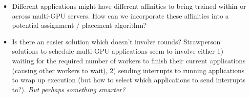 \documentclass{article}
\begin{document}
\begin{itemize}
\item Different applications might have different affinities to being trained
within or across multi-GPU servers. How can we incorporate these affinities into
a potential assignment / placement algorithm?

\item Is there an easier solution which doesn't involve rounds? Strawperson
solutions to schedule multi-GPU applications seem to involve either 1)
waiting for the required number of workers to finish their current applications
(causing other workers to wait), 2) sending interrupts to running applications
to wrap up execution (but how to select which applications to send interrupts to?).
\textit{But perhaps something smarter?}

\end{itemize}
\end{document}
